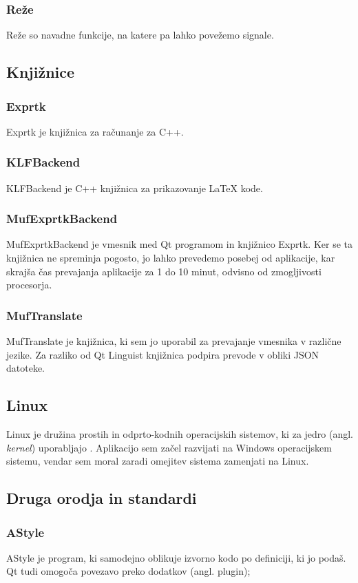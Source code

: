 \documentclass[12pt,titlepage]{report}
\begin{document}
			\subsubsection{Reže\cite{qt_slots}}
				Reže so navadne funkcije, na katere pa lahko povežemo signale.
		\subsection{Knjižnice}
			\subsubsection{Exprtk\cite{exprtk,exprtk_git}}
				Exprtk je knjižnica za računanje za C++.
			\subsubsection{KLFBackend\cite{qt_klf}}
				KLFBackend je C++ knjižnica za prikazovanje \LaTeX{} kode.
			\subsubsection{MufExprtkBackend}
				MufExprtkBackend je vmesnik med Qt programom in knjižnico Exprtk.
				Ker se ta knjižnica ne spreminja pogosto, jo lahko prevedemo posebej od aplikacije, kar skrajša čas prevajanja aplikacije za 1 do 10 minut, odvisno od zmogljivosti procesorja.
			\subsubsection{MufTranslate}
				MufTranslate je knjižnica, ki sem jo uporabil za prevajanje vmesnika v različne jezike.
				Za razliko od Qt Linguist knjižnica podpira prevode v obliki JSON datoteke.
		
		\subsection{Linux}
			Linux je družina prostih in odprto-kodnih operacijskih sistemov, ki za jedro (angl. \emph{kernel}) uporabljajo .
			Aplikacijo sem začel razvijati na Windows operacijskem sistemu, vendar sem moral zaradi omejitev sistema zamenjati na Linux. %
			
		\subsection{Druga orodja in standardi}
			\subsubsection{AStyle\cite{astyle}}
				AStyle je program, ki samodejno oblikuje izvorno kodo po definiciji, ki jo podaš.
				Qt tudi omogoča povezavo preko dodatkov (angl. plugin);
\end{document}
